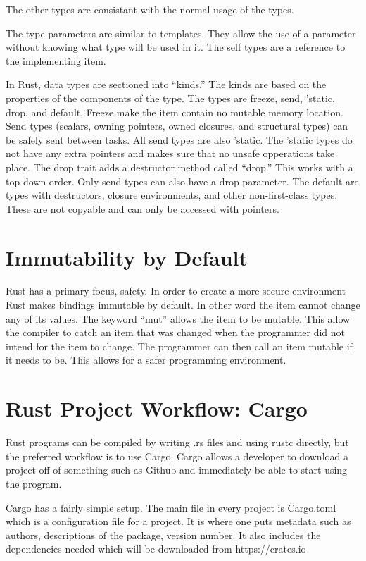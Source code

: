 \documentclass{article}
\begin{document}
The other types are consistant with the normal usage of the types.

The type parameters are similar to templates. They allow the use of a parameter without knowing what type will be used in it. The self types are a reference to the implementing item. 

In Rust, data types are sectioned into “kinds.” The kinds are based on the properties of the components of the type. The types are freeze, send, 'static, drop, and default. Freeze make the item contain no mutable memory location. Send types (scalars, owning pointers, owned closures, and structural types) can be safely sent between tasks. All send types are also 'static. The 'static types do not have any extra pointers and makes sure that no unsafe opperations take place. 
The drop trait adds a destructor method called “drop.” This works with a top-down order. Only send types can also have a drop parameter. The default are types with destructors, closure environments, and other non-first-class types. These are not copyable and can only be accessed with pointers.

\section{Immutability by Default}
Rust has a primary focus, safety. In order to create a more secure environment Rust makes bindings immutable by default. In other word the item cannot change any of its values. The keyword “mut” allows the item to be mutable. This allow the compiler to catch an item that was changed when the programmer did not intend for the item to change. The programmer can then call an item mutable if it needs to be. This allows for a safer programming environment.

\section{Rust Project Workflow: Cargo}
Rust programs can be compiled by writing .rs files and using rustc directly, but the preferred workflow is to use Cargo. Cargo allows a developer to download a project off of something such as Github and immediately be able to start using the program.

Cargo has a fairly simple setup. The main file in every project is Cargo.toml which is a configuration file for a project. It is where one puts metadata such as authors, descriptions of the package, version number. It also includes the dependencies needed which will be downloaded from https://crates.io
\end{document}
